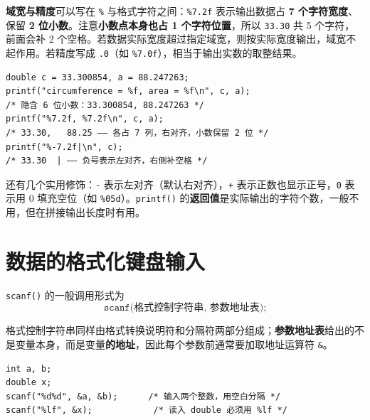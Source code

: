 \textbf{域宽与精度}可以写在 \texttt{\%} 与格式字符之间：\texttt{\%7.2f} 表示输出数据占 \textbf{7 个字符宽度}、保留 \textbf{2 位小数}。注意\textbf{小数点本身也占 1 个字符位置}，所以 \texttt{33.30} 共 5 个字符，前面会补 2 个空格。若数据实际宽度超过指定域宽，则按实际宽度输出，域宽不起作用。若精度写成 \texttt{.0}（如 \texttt{\%7.0f}），相当于输出实数的取整结果。

\begin{lstlisting}
double c = 33.300854, a = 88.247263;
printf("circumference = %f, area = %f\n", c, a);
/* 隐含 6 位小数：33.300854, 88.247263 */
printf("%7.2f, %7.2f\n", c, a);
/* 33.30,   88.25 —— 各占 7 列，右对齐，小数保留 2 位 */
printf("%-7.2f|\n", c);
/* 33.30  | —— 负号表示左对齐，右侧补空格 */
\end{lstlisting}

还有几个实用修饰：\texttt{-} 表示左对齐（默认右对齐），\texttt{+} 表示正数也显示正号，\texttt{0} 表示用 0 填充空位（如 \texttt{\%05d}）。\texttt{printf()} 的\textbf{返回值}是实际输出的字符个数，一般不用，但在拼接输出长度时有用。


\section{数据的格式化键盘输入}

\texttt{scanf()} 的一般调用形式为
\[
\texttt{scanf(格式控制字符串,\ 参数地址表);}
\]

格式控制字符串同样由格式转换说明符和分隔符两部分组成；\textbf{参数地址表}给出的不是变量本身，而是变量\textbf{的地址}，因此每个参数前通常要加取地址运算符 \texttt{\&}。

\begin{lstlisting}
int a, b;
double x;
scanf("%d%d", &a, &b);      /* 输入两个整数，用空白分隔 */
scanf("%lf", &x);            /* 读入 double 必须用 %lf */
\end{lstlisting}

